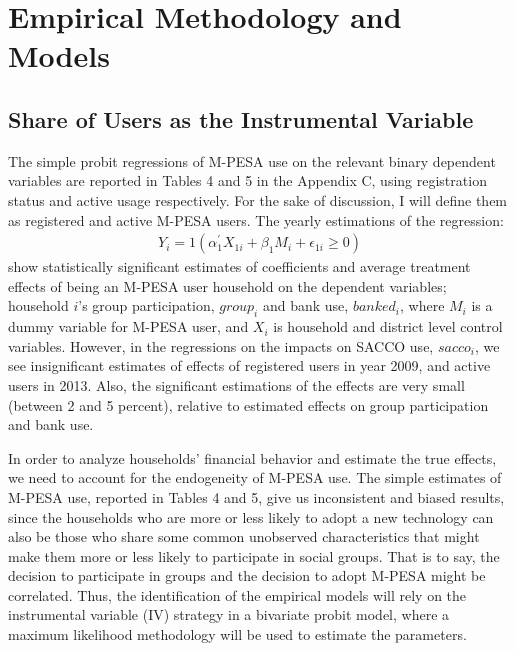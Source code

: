 \documentclass[11pt]{article}
\numberwithin{equation}{section}
\begin{document}
\section{Empirical Methodology and Models}


\subsection{Share of Users as the Instrumental Variable}

The simple probit regressions of M-PESA use on the relevant binary dependent variables are reported in Tables 4 and 5 in the Appendix C, using registration status and active usage respectively. For the sake of discussion, I will define them as registered and active M-PESA users. The yearly estimations of the regression:
\begin{align}
Y_i= 1(\alpha_1 ^{'} X_{1i}+ \beta_1 M_i+ \epsilon_{1i} \ge 0)
\end{align}
show statistically significant estimates of coefficients and average treatment effects of being an M-PESA user household on the dependent variables; household $i$'s group participation, $group_i$ and bank use, $banked_i$, where $M_i$ is a dummy variable for M-PESA user, and $X_i$ is household and district level control variables. However, in the regressions on the impacts on SACCO use, $sacco_i$, we see insignificant estimates of effects of registered users in year 2009, and active users in 2013. Also, the significant estimations of the effects are very small (between 2 and 5 percent), relative to estimated effects on group participation and bank use. 


In order to analyze households' financial behavior and estimate the true effects, we need to account for the endogeneity of M-PESA use. The simple estimates of M-PESA use, reported in Tables 4 and 5, give us inconsistent and biased results, since the households who are more or less likely to adopt a new technology can also be those who share some common unobserved characteristics that might make them more or less likely to participate in social groups. That is to say, the decision to participate in groups and the decision to adopt M-PESA might be correlated. Thus, the identification of the empirical models will rely on the instrumental variable (IV) strategy in a bivariate probit model, where a maximum likelihood methodology will be used to estimate the parameters. 
\end{document}
